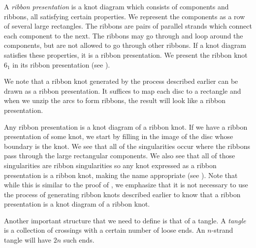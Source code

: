 \begin{paper}

A \textit{ribbon presentation} is a knot diagram which consists of components
and ribbons, all satisfying certain properties.
We represent the components as a row of several large rectangles.
The ribbons are pairs of parallel strands which connect each component to the
next.
The ribbons may go through and loop around the components, but are not allowed
to go through other ribbons.
If a knot diagram satisfies these properties, it is a ribbon presentation.
We present the ribbon knot $6_1$ in its ribbon presentation (see
\figPresentation).

We note that a ribbon knot generated by the process described earlier can be
drawn as a ribbon presentation.
It suffices to map each disc to a rectangle and when we unzip the arcs to form
ribbons, the result will look like a ribbon presentation.

Any ribbon presentation is a knot diagram of a ribbon knot.
If we have a ribbon presentation of some knot, we start by filling in the image
of the disc whose boundary is the knot.
We see that all of the singularities occur where the ribbons pass through the
large rectangular components.
We also see that all of those singularities are ribbon singularities so any
knot expressed as a ribbon presentation is a ribbon knot, making the name
appropriate (see \figSingularities).
Note that while this is similar to the proof of \prpGeneration, we emphasize
that it is not necessary to use the process of generating ribbon knots described
earlier to know that a ribbon presentation is a knot diagram of a ribbon knot.


Another important structure that we need to define is that of a tangle.
A \textit{tangle} is a collection of crossings with a certain number of loose
ends.
An $n$-strand tangle will have $2n$ such ends.\\


\end{paper}
